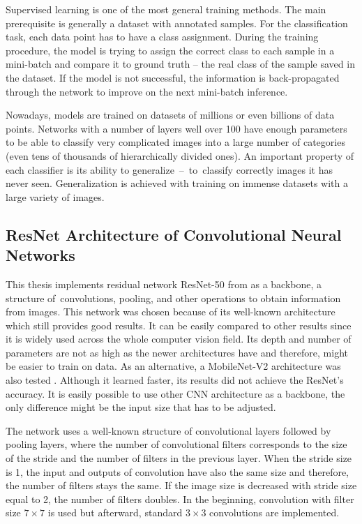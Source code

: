 Supervised learning is one of the most general training methods. The main prerequisite is generally a dataset with annotated samples. For the classification task, each data point has to have a class assignment. During the training procedure, the model is trying to assign the correct class to each sample in a mini-batch and compare it to ground truth -- the real class of the sample saved in the dataset. If the model is not successful, the information is back-propagated through the network to improve on the next mini-batch inference.

Nowadays, models are trained on datasets of millions or even billions of data points. Networks with a number of layers well over 100 have enough parameters to be able to classify very complicated images into a large number of categories (even tens of thousands of hierarchically divided ones). An important property of each classifier is its ability to generalize~--~to~classify correctly images it has never seen. Generalization is achieved with training on immense datasets with a large variety of images.

\subsection{ResNet Architecture of Convolutional Neural Networks}

This thesis implements residual network ResNet-50 from \cite{he2015deep-resnet} as a backbone, a structure of~convolutions, pooling, and other operations to obtain information from images. This network was chosen because of its well-known architecture which still provides good results. It can be easily compared to other results since it is widely used across the whole computer vision field. Its depth and number of parameters are not as high as the newer architectures have and therefore, might be easier to train on data. As an alternative, a MobileNet-V2 architecture was also tested \cite{mobilenetv2}. Although it learned faster, its results did not achieve the ResNet's accuracy. It is easily possible to use other CNN architecture as a backbone, the only difference might be the input size that has to be adjusted.

The network uses a well-known structure of convolutional layers followed by pooling layers, where the number of convolutional filters corresponds to the size of the stride and the number of filters in the previous layer. When the stride size is 1, the input and outputs of convolution have also the same size and therefore, the number of filters stays the same. If the image size is decreased with stride size equal to 2, the number of filters doubles. In the beginning, convolution with filter size $7 \times 7$ is used but afterward, standard $3 \times 3$ convolutions are implemented.

